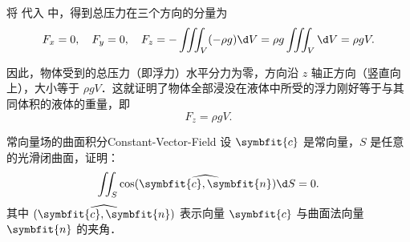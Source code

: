 \begin{myproof}
    将  代入  中，得到总压力在三个方向的分量为
    \begin{equation}
        \label{eq:final-components}
        F_x = 0, \quad F_y = 0, \quad F_z = -\iiint_V (-\rho g) \d V = \rho g \iiint_V \d V = \rho g V.
    \end{equation}

    因此，物体受到的总压力（即浮力）水平分力为零，方向沿 $z$ 轴正方向（竖直向上），大小等于 $\rho g V$．这就证明了物体全部浸没在液体中所受的浮力刚好等于与其同体积的液体的重量，即
    \begin{equation}
        \label{eq:result-2}
        \boxed{F_z = \rho g V}.
    \end{equation}
\end{myproof}

\begin{problem}{常向量场的曲面积分}{Constant-Vector-Field}
    设 $\symbfit{c}$ 是常向量，$S$ 是任意的光滑闭曲面，证明：
    \begin{equation}
        \iint_S \cos(\widehat{\symbfit{c}, \symbfit{n}}) \d S = 0.
    \end{equation}
    其中 $(\widehat{\symbfit{c}, \symbfit{n}})$ 表示向量 $\symbfit{c}$ 与曲面法向量 $\symbfit{n}$ 的夹角．
\end{problem}

